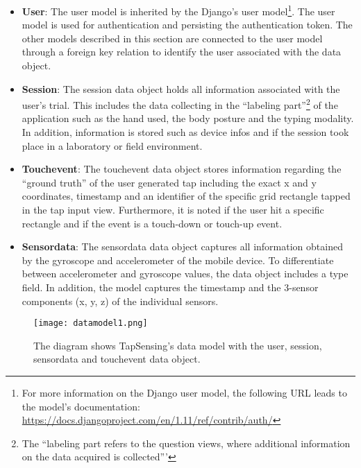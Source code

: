 \begin{itemize}
  \item \textbf{User}: The user model is inherited by the Django's user model\footnote{For more information on the Django user model, the following URL leads to the model's documentation: \url{https://docs.djangoproject.com/en/1.11/ref/contrib/auth/}}. The user model is used for authentication and persisting the authentication token. The other models described in this section are connected to the user model through a foreign key relation to identify the user associated with the data object.
  \item \textbf{Session}: The session data object holds all information associated with the user's trial. This includes the data collecting in the ``labeling part''\footnote{The ``labeling part refers to the question views, where additional information on the data acquired is collected'''} of the application such as the hand used, the body posture and the typing modality. In addition, information is stored such as device infos and if the session took place in a laboratory or field environment.
  \item \textbf{Touchevent}: The touchevent data object stores information regarding the ``ground truth'' of the user generated tap including the exact x and y coordinates, timestamp and an identifier of the specific grid rectangle tapped in the tap input view. Furthermore, it is noted if the user hit a specific rectangle and if the event is a touch-down or touch-up event.
  \item \textbf{Sensordata}: The sensordata data object captures all information obtained by the gyroscope and accelerometer of the mobile device. To differentiate between accelerometer and gyroscope values, the data object includes a type field. In addition, the model captures the timestamp and the 3-sensor components (x, y, z) of the individual sensors.
\end{itemize}

\begin{figure}[h!]
  \centering
  \texttt{[image: datamodel1.png]}
  \caption{The diagram shows TapSensing's data model with the user, session, sensordata and touchevent data object.} \label{fig:erdiagram}
\end{figure}



